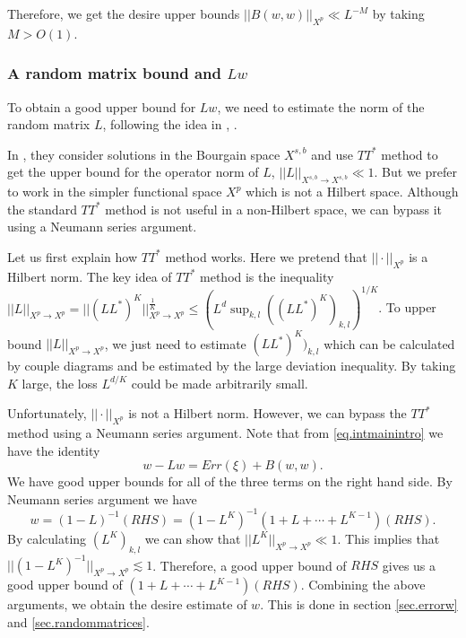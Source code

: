 Therefore, we get the desire upper bounds $||B(w,w)||_{X^p}\ll L^{-M}$ by taking $M> O(1)$.

\subsubsection{A random matrix bound and $Lw$}\label{sec.randmatintro} To obtain a good upper bound for $Lw$, we need to estimate the norm of the random matrix $L$, following the idea in \cite{DH}, \cite{DH2}.

In \cite{DH}, they consider solutions in the Bourgain space $X^{s,b}$ and use $TT^*$ method to get the upper bound for the operator norm of $L$, $||L||_{X^{s,b}\rightarrow X^{s,b}}\ll 1$. But we prefer to work in the simpler functional space $X^p$ which is not a Hilbert space. Although the standard $TT^*$ method is not useful in a non-Hilbert space, we can bypass it using a Neumann series argument.

Let us first explain how $TT^*$ method works. Here we pretend that $||\cdot||_{X^p}$ is a Hilbert norm. The key idea of $TT^*$ method is the inequality $||L||_{X^p\rightarrow X^p}=||(LL^*)^K||_{X^p\rightarrow X^p}^{\frac{1}{K}}\le (L^d\sup_{k,l} ((LL^*)^K)_{k,l})^{1/K}$. To upper bound $||L||_{X^p\rightarrow X^p}$, we just need to estimate $(LL^*)^K)_{k,l}$ which can be calculated by couple diagrams and be estimated by the large deviation inequality. By taking $K$ large, the loss $L^{d/K}$ could be made arbitrarily small.

Unfortunately, $||\cdot||_{X^p}$ is not a Hilbert norm. However, we can bypass the $TT^*$ method using a Neumann series argument. Note that from \eqref{eq.intmainintro} we have the identity
\begin{equation}
    w-Lw= Err(\xi)+B(w,w).
\end{equation}
We have good upper bounds for all of the three terms on the right hand side. By Neumann series argument we have
\begin{equation}
    w= (1-L)^{-1}(\textit{RHS}) =(1-L^K)^{-1}(1+L+\cdots+L^{K-1})(\textit{RHS}).
\end{equation}
By calculating $(L^K)_{k,l}$ we can show that $||L^K||_{X^p\rightarrow X^p}\ll 1$. This implies that $||(1-L^K)^{-1}||_{X^p\rightarrow X^p}\lesssim 1$. Therefore, a good upper bound of $\textit{RHS}$ gives us a good upper bound of $(1+L+\cdots+L^{K-1})(\textit{RHS})$. Combining the above arguments, we obtain the desire estimate of $w$. This is done in section \ref{sec.errorw} and \ref{sec.randommatrices}.

